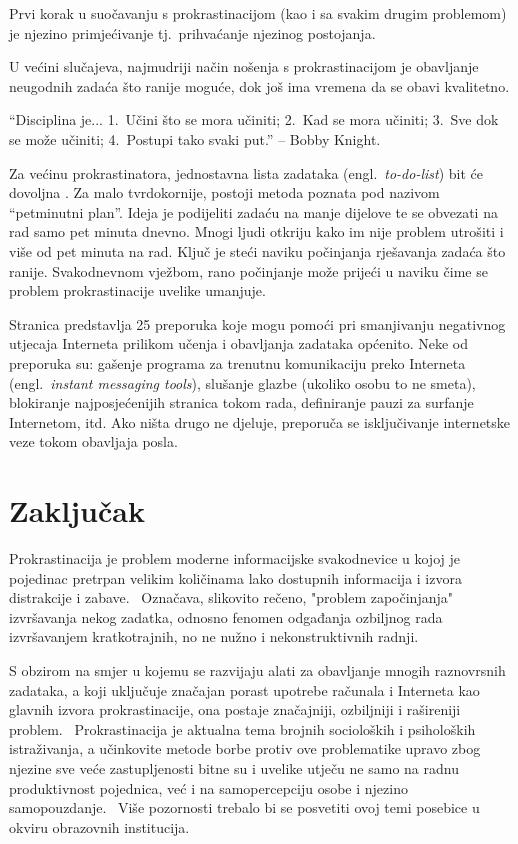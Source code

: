 \documentclass[11pt,twocolumn,english]{article}
\newcommand{\engl}[1]{(engl.~\emph{#1})}
\begin{document}
Prvi korak u suočavanju s prokrastinacijom (kao i sa svakim drugim problemom)
je njezino primjećivanje tj.~prihvaćanje njezinog postojanja. 

U većini slučajeva, najmudriji način nošenja s prokrastinacijom je obavljanje
neugodnih zadaća što ranije moguće, dok još ima vremena da se obavi kvalitetno.

``Disciplina je... 1.~Učini što se mora učiniti; 2.~Kad se mora učiniti; 3.~Sve
dok se može učiniti; 4.~Postupi tako svaki put.'' -- Bobby Knight.  

Za većinu prokrastinatora, jednostavna lista zadataka \engl{to-do-list}
bit će dovoljna \cite{TuckerPsySelfHelp}. Za malo tvrdokornije, postoji metoda
poznata pod nazivom ``petminutni plan''. Ideja je podijeliti zadaću na manje
dijelove te se obvezati na rad samo pet minuta dnevno. Mnogi ljudi otkriju kako
im nije problem utrošiti i više od pet minuta na rad. Ključ je steći naviku
počinjanja rješavanja zadaća što ranije. Svakodnevnom vježbom, rano počinjanje
može prijeći u naviku čime se problem prokrastinacije uvelike umanjuje.

Stranica \cite{ColDeg25ways} predstavlja 25 preporuka koje mogu
pomoći pri smanjivanju negativnog utjecaja Interneta prilikom učenja i obavljanja
zadataka općenito. Neke od preporuka su: gašenje programa za trenutnu
komunikaciju preko Interneta \engl{instant messaging tools}, slušanje glazbe
(ukoliko osobu to ne smeta), blokiranje najposjećenijih stranica tokom rada,
definiranje pauzi za surfanje Internetom, itd. Ako ništa drugo ne djeluje,
preporuča se isključivanje internetske veze tokom obavljaja posla.


\section{Zaključak}


Prokrastinacija je problem moderne informacijske svakodnevice u kojoj 
je pojedinac pretrpan velikim količinama lako dostupnih  informacija i 
izvora distrakcije i zabave.~ Označava, slikovito rečeno, "problem započinjanja" 
izvršavanja nekog zadatka, odnosno fenomen odgađanja ozbiljnog rada 
izvršavanjem kratkotrajnih, no ne nužno i nekonstruktivnih radnji. 

S obzirom na smjer u kojemu se razvijaju alati za obavljanje mnogih raznovrsnih 
zadataka, a koji uključuje značajan porast upotrebe računala i Interneta kao glavnih 
izvora prokrastinacije, ona postaje značajniji, ozbiljniji i rašireniji problem.~
Prokrastinacija je aktualna tema brojnih socioloških i psiholoških 
istraživanja, a učinkovite metode borbe protiv ove problematike upravo zbog 
njezine sve veće zastupljenosti bitne su i uvelike utječu ne samo na radnu produktivnost 
pojednica, već i na samopercepciju osobe i njezino samopouzdanje.~ Više pozornosti 
trebalo bi se posvetiti ovoj temi posebice u okviru obrazovnih institucija.~



\end{document}
